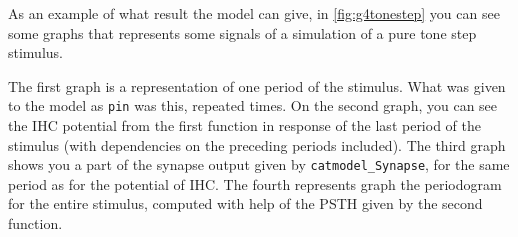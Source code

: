 As an example of what result the model can give,
in \autoref{fig:g4tonestep} you can see some graphs that represents some signals of a 
simulation of a pure tone step stimulus. 



The first graph is a representation of one period of the stimulus. 
What was given to the model as \texttt{pin} was this, repeated %
times.
On the second graph, you can see the IHC potential from the first function
 in response of the last %
period of the stimulus (with dependencies on the preceding periods included).
The third graph shows you a part of the synapse output given by \texttt{catmodel\_Synapse}, 
for the same period as for the potential of IHC.
The fourth represents graph the periodogram for the entire stimulus, 
computed with help of the PSTH given by the second function.



 





